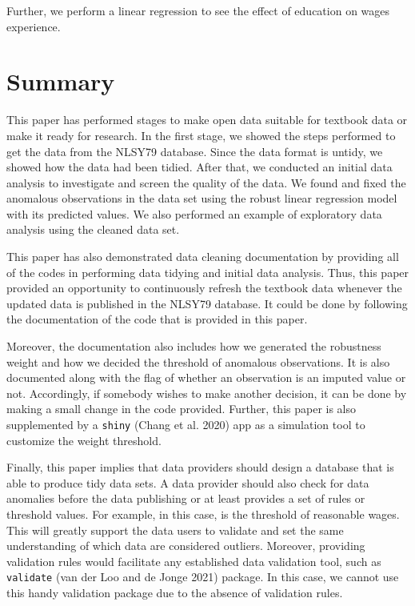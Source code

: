 \documentclass{article}
\begin{document}
Further, we perform a linear regression to see the effect of education on wages experience.

\hypertarget{summary}{%
\section{Summary}\label{summary}}

This paper has performed stages to make open data suitable for textbook data or make it ready for research. In the first stage, we showed the steps performed to get the data from the NLSY79 database. Since the data format is untidy, we showed how the data had been tidied. After that, we conducted an initial data analysis to investigate and screen the quality of the data. We found and fixed the anomalous observations in the data set using the robust linear regression model with its predicted values. We also performed an example of exploratory data analysis using the cleaned data set.

This paper has also demonstrated data cleaning documentation by providing all of the codes in performing data tidying and initial data analysis. Thus, this paper provided an opportunity to continuously refresh the textbook data whenever the updated data is published in the NLSY79 database. It could be done by following the documentation of the code that is provided in this paper.

Moreover, the documentation also includes how we generated the robustness weight and how we decided the threshold of anomalous observations. It is also documented along with the flag of whether an observation is an imputed value or not. Accordingly, if somebody wishes to make another decision, it can be done by making a small change in the code provided. Further, this paper is also supplemented by a \texttt{shiny} (Chang et al. 2020) app as a simulation tool to customize the weight threshold.

Finally, this paper implies that data providers should design a database that is able to produce tidy data sets. A data provider should also check for data anomalies before the data publishing or at least provides a set of rules or threshold values. For example, in this case, is the threshold of reasonable wages. This will greatly support the data users to validate and set the same understanding of which data are considered outliers. Moreover, providing validation rules would facilitate any established data validation tool, such as \texttt{validate} (van der Loo and de Jonge 2021) package. In this case, we cannot use this handy validation package due to the absence of validation rules.
\end{document}
